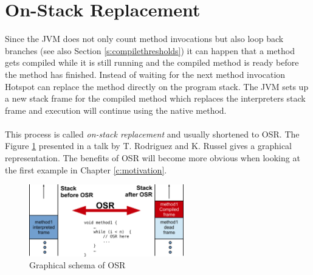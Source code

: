 \section{On-Stack Replacement}
\label{s:onstackreplacement}
Since the JVM does not only count method invocations but also loop back branches (see also Section \ref{s:compilethresholds}) it can happen that a method gets compiled while it is still running and the compiled method is ready before the method has finished.
Instead of waiting for the next method invocation Hotspot can replace the method directly on the program stack. The JVM sets up a new stack frame for the compiled method which replaces the interpreters stack frame and execution will continue using the native method.
\\\\
This process is called \textit{on-stack replacement} and usually shortened to OSR. The Figure \ref{f:osr} presented in a talk by T. Rodriguez and K. Russel \cite{client_compiler_talk} gives a graphical representation.
The benefits of OSR will become more obvious when looking at the first example in Chapter \ref{c:motivation}.
\begin{figure}[ht]
  \begin{center}
    \centering
    \includegraphics[width=0.6\textwidth]{figures/osr.png}
    \caption{Graphical schema of OSR}
    \label{f:osr}
  \end{center}
\end{figure}
